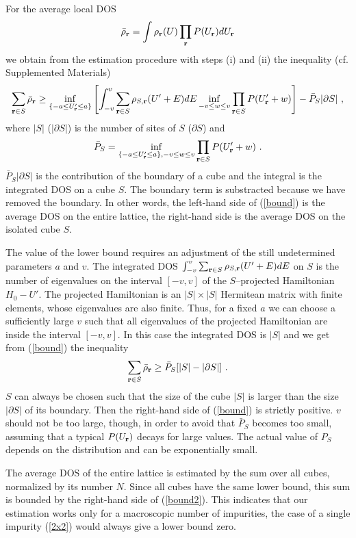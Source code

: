 \documentclass[aps]{revtex4}
\def\beq{\begin{equation}}
\def\eeq{\end{equation}}
\def\br{{\bf r}}
\begin{document}
For the average local DOS
\beq
{\bar \rho}_\br=\int\rho_\br(U) \prod_{\br}P(U_\br)dU_\br
\eeq
we obtain from the estimation procedure with steps (i) and (ii) the inequality 
(cf. Supplemented Materials)
\beq
\sum_{\br\in S}{\bar\rho}_\br\ge
\inf_{\{-a\le U_\br'\le a\}}\left[\int_{-v}^v
\sum_{\br \in S}\rho_{S,\br}(U'+E)dE \inf_{-v\le w\le v}\prod_{\br\in S}P(U_\br'+w)\right]
-{\bar P}_S|\partial S|
\ ,
\label{bound}
\eeq
where $|S|$ ($|\partial S|$) is the number of sites of $S$ ($\partial S$) and
\[
{\bar P}_S=\inf_{\{-a\le U_\br'\le a\},-v\le w\le v}\prod_{\br\in S}P(U_\br'+w)
\ .
\]
${\bar P}_S|\partial S|$ is the contribution of the boundary of a cube
and the integral is the integrated DOS on a cube $S$. The boundary term is substracted
because we have removed the boundary. In other words, the left-hand side of (\ref{bound}) is
the average DOS on the entire lattice, the right-hand side is the average DOS on the isolated 
cube $S$.

The value of the lower bound requires an adjustment of the still undetermined parameters 
$a$ and $v$. The integrated DOS $\int_{-v}^v\sum_{\br \in S}\rho_{S,\br}(U'+E)dE$  on $S$
is the number of eigenvalues on the interval $[-v,v]$ of the $S$--projected Hamiltonian 
$H_0-U'$. The projected Hamiltonian is an $|S|\times |S|$ Hermitean matrix with finite elements, 
whose eigenvalues are also finite. Thus, for a fixed $a$ we can choose a sufficiently large $v$
such that all eigenvalues of the projected Hamiltonian are inside the interval $[-v,v]$.
In this case the integrated DOS is $|S|$ and we get from (\ref{bound}) the inequality
\beq
\sum_{\br\in S}{\bar\rho}_\br\ge {\bar P}_S[|S|-|\partial S|] 
\ .
\label{bound2}
\eeq 
$S$ can always be chosen such that the size of the cube $|S|$ is larger than the size
$|\partial S|$ of its boundary. Then the right-hand side of (\ref{bound}) is strictly positive.
$v$ should not be too large, though, in order to avoid that ${\bar P}_S$ becomes
too small, assuming that a typical $P(U_\br)$ decays for large values.
The actual value of $P_S$ depends on the distribution and can be exponentially small.

The average DOS of the entire lattice is estimated by the sum over all cubes, normalized by 
its number $N$. Since all cubes have the same lower bound, this sum is bounded by the right-hand 
side of (\ref{bound2}). This indicates that our estimation works only for a macroscopic number of 
impurities, the case of a single impurity (\ref{2x2}) would always give a lower bound zero.
\end{document}
